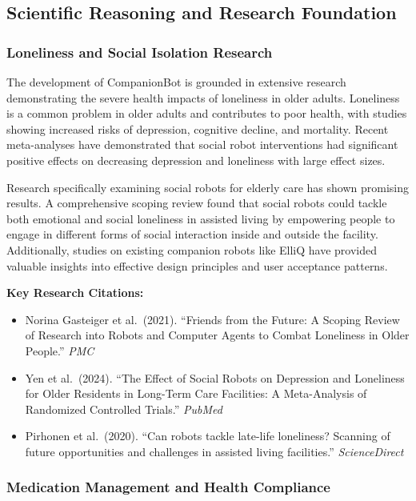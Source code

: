 \documentclass[
  letterpaper,
  DIV=11,
  numbers=noendperiod]{scrartcl}
\providecommand{\tightlist}{%
  \setlength{\itemsep}{0pt}\setlength{\parskip}{0pt}}\usepackage{longtable,booktabs,array}
\begin{document}
\subsection{Scientific Reasoning and Research
Foundation}\label{scientific-reasoning-and-research-foundation}

\subsubsection{Loneliness and Social Isolation
Research}\label{loneliness-and-social-isolation-research}

The development of CompanionBot is grounded in extensive research
demonstrating the severe health impacts of loneliness in older adults.
Loneliness is a common problem in older adults and contributes to poor
health, with studies showing increased risks of depression, cognitive
decline, and mortality. Recent meta-analyses have demonstrated that
social robot interventions had significant positive effects on
decreasing depression and loneliness with large effect sizes.

Research specifically examining social robots for elderly care has shown
promising results. A comprehensive scoping review found that social
robots could tackle both emotional and social loneliness in assisted
living by empowering people to engage in different forms of social
interaction inside and outside the facility. Additionally, studies on
existing companion robots like ElliQ have provided valuable insights
into effective design principles and user acceptance patterns.

\textbf{Key Research Citations:}

\begin{itemize}
\tightlist
\item
  Norina Gasteiger et al.~(2021). ``Friends from the Future: A Scoping
  Review of Research into Robots and Computer Agents to Combat
  Loneliness in Older People.'' \emph{PMC}
\item
  Yen et al.~(2024). ``The Effect of Social Robots on Depression and
  Loneliness for Older Residents in Long-Term Care Facilities: A
  Meta-Analysis of Randomized Controlled Trials.'' \emph{PubMed}
\item
  Pirhonen et al.~(2020). ``Can robots tackle late-life loneliness?
  Scanning of future opportunities and challenges in assisted living
  facilities.'' \emph{ScienceDirect}
\end{itemize}

\subsubsection{Medication Management and Health
Compliance}\label{medication-management-and-health-compliance}
\end{document}
